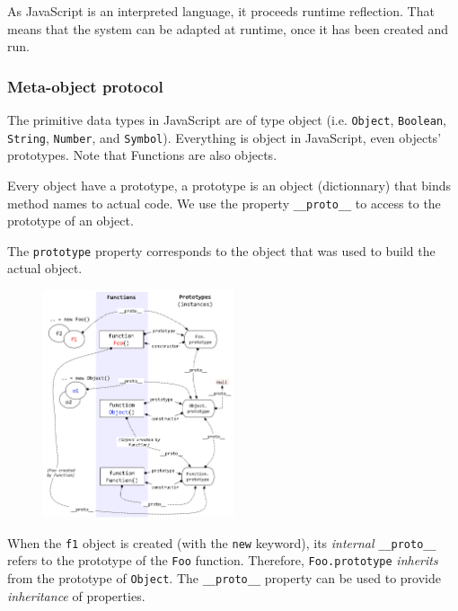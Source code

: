 \documentclass[a4paper,10pt]{article}
\begin{document}
As JavaScript is an interpreted language, it proceeds runtime reflection.
That means that the system can be adapted at runtime, once it has been created and run.



\subsubsection{Meta-object protocol}

The primitive data types in JavaScript are of type object (i.e. \lstinline|Object|, \mbox{\lstinline|Boolean|,} \lstinline|String|, \lstinline|Number|, and \lstinline|Symbol|).
Everything is object in JavaScript, even objects’ prototypes.
Note that Functions are also objects.

Every object have a prototype, a prototype is an object (dictionnary) that binds method names to actual code. We use the property \lstinline|__proto__| to access to the prototype of an object.

The \lstinline|prototype| property corresponds to the object that was used to build the actual object.

\begin{figure}[h]
    \centering
    \includegraphics[width=0.5\textwidth]{jstypes.png}
\end{figure}

When the \lstinline|f1| object is created (with the \lstinline|new| keyword), its \textit{internal} \lstinline|__proto__| refers to the prototype of the \lstinline|Foo| function.
Therefore, \lstinline|Foo.prototype| \textit{inherits} from the prototype of \lstinline|Object|.
The \lstinline|__proto__| property can be used to provide \textit{inheritance} of properties.
\end{document}
